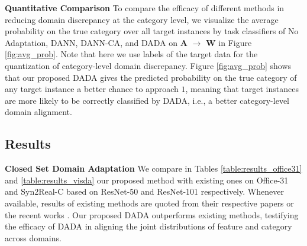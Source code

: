 \documentclass[letterpaper]{article} \usepackage{aaai20}  \usepackage{times}  \usepackage{helvet} \usepackage{courier}  \usepackage[hyphens]{url}  \usepackage{graphicx} \urlstyle{rm} \def\UrlFont{\rm}  \usepackage{graphicx}  \frenchspacing  \setlength{\pdfpagewidth}{8.5in}  \setlength{\pdfpageheight}{11in}
\begin{document}
\noindent\textbf{Quantitative Comparison} To compare the efficacy of different methods in reducing domain discrepancy at the category level, we visualize the average probability on the true category over all target instances by task classifiers of No Adaptation, DANN, DANN-CA, and DADA on \textbf{A} $\rightarrow$ \textbf{W} in Figure \ref{fig:avg_prob}. Note that here we use labels of the target data for the quantization of category-level domain discrepancy. Figure \ref{fig:avg_prob} shows that our proposed DADA gives the predicted probability on the true category of any target instance a better chance to approach $1$, meaning that target instances are more likely to be correctly classified by DADA, i.e., a better category-level domain alignment.

\begin{table}[!htb]
	\begin{center}
		\caption{Results for partial domain adaptation on Syn2Real-C based on ResNet-50. Note that all compared methods are based on \textbf{PyTorch} implementation.}
		\label{table:results_visda_partial_transfer}
	\end{center}
\end{table}

\subsection{Results}
\noindent\textbf{Closed Set Domain Adaptation} We compare in Tables \ref{table:results_office31} and \ref{table:results_visda} our proposed method with existing ones on Office-31 and Syn2Real-C based on ResNet-50 and ResNet-101 respectively. Whenever available, results of existing methods are quoted from their respective papers or the recent works \cite{mada,cdan,tat,mcd}. Our proposed DADA outperforms existing methods, testifying the efficacy of DADA in aligning the joint distributions of feature and category across domains.
\end{document}
